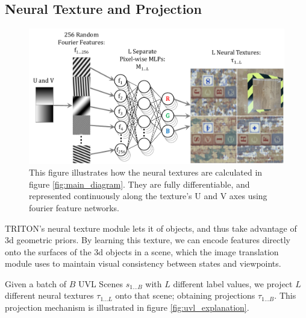 \documentclass{article}
\begin{document}
\subsection{Neural Texture and Projection}

	\begin{figure}[H]
		\begin{center}
			\includegraphics[width=400pt]{../images/learnable_textures.pdf}
		\end{center}
		\caption{
			This figure illustrates how the neural textures are calculated in figure \ref{fig:main_diagram}. They are fully differentiable, and represented continuously along the texture's U and V axes using fourier feature networks.
		}
		\label{fig:learnable_textures}
	\end{figure}

	TRITON's neural texture module lets it  of objects, and thus take advantage of 3d geometric priors. By learning this texture, we can encode features directly onto the surfaces of the 3d objects in a scene, which the image translation module uses to maintain visual consistency between states and viewpoints.

	Given a batch of $B$ UVL Scenes $s_{1\dots B}$ with $L$ different label values, we project $L$ different neural textures $\tau_{1\dots L}$ onto that scene; obtaining projections $\tau_{1\dots B}$. This projection mechanism is illustrated in figure \ref{fig:uvl_explanation}.
\end{document}
